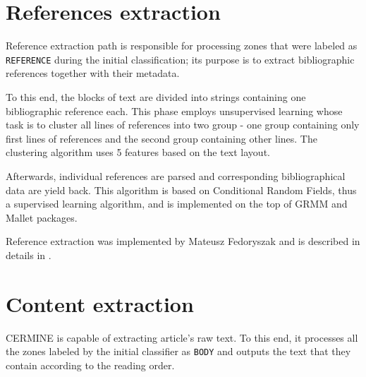 \section{References extraction}
Reference extraction path is responsible for processing zones that were labeled as \verb+REFERENCE+ during the initial classification; its purpose is to extract bibliographic references together with their metadata.

To this end, the blocks of text are divided into strings containing one bibliographic reference each. This phase employs unsupervised learning whose task is to cluster all lines of references into two group - one group containing only first lines of references and the second group containing other lines. The clustering algorithm uses 5 features based on the text layout.

Afterwards, individual references are parsed and corresponding bibliographical data are yield back. This algorithm is based on Conditional Random Fields, thus a supervised learning algorithm, and is implemented on the top of GRMM and Mallet packages.

Reference extraction was implemented by Mateusz Fedoryszak and is described in details in \cite{DominikaTkaczykPaweSzostekMateuszFedoryszakPiotrJanDendek2014}.
\section{Content extraction}
CERMINE is capable of extracting article's raw text. To this end, it processes all the zones labeled by the initial classifier as \verb+BODY+ and outputs the text that they contain according to the reading order. 

